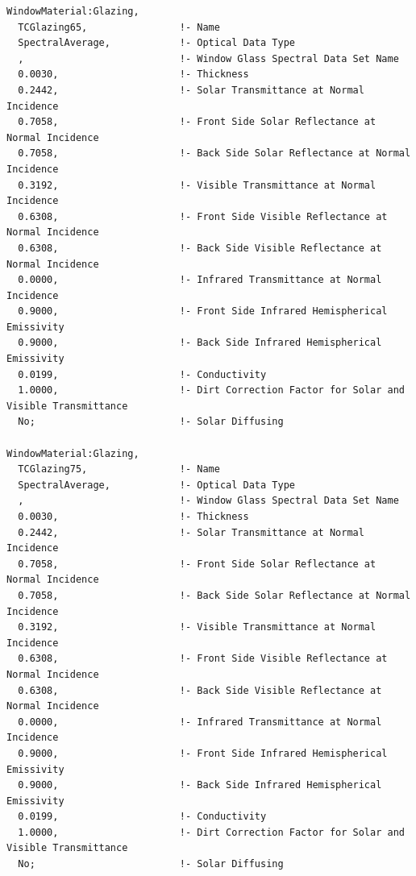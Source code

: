 \begin{lstlisting}
WindowMaterial:Glazing,
  TCGlazing65,                !- Name
  SpectralAverage,            !- Optical Data Type
  ,                           !- Window Glass Spectral Data Set Name
  0.0030,                     !- Thickness
  0.2442,                     !- Solar Transmittance at Normal Incidence
  0.7058,                     !- Front Side Solar Reflectance at Normal Incidence
  0.7058,                     !- Back Side Solar Reflectance at Normal Incidence
  0.3192,                     !- Visible Transmittance at Normal Incidence
  0.6308,                     !- Front Side Visible Reflectance at Normal Incidence
  0.6308,                     !- Back Side Visible Reflectance at Normal Incidence
  0.0000,                     !- Infrared Transmittance at Normal Incidence
  0.9000,                     !- Front Side Infrared Hemispherical Emissivity
  0.9000,                     !- Back Side Infrared Hemispherical Emissivity
  0.0199,                     !- Conductivity
  1.0000,                     !- Dirt Correction Factor for Solar and Visible Transmittance
  No;                         !- Solar Diffusing

WindowMaterial:Glazing,
  TCGlazing75,                !- Name
  SpectralAverage,            !- Optical Data Type
  ,                           !- Window Glass Spectral Data Set Name
  0.0030,                     !- Thickness
  0.2442,                     !- Solar Transmittance at Normal Incidence
  0.7058,                     !- Front Side Solar Reflectance at Normal Incidence
  0.7058,                     !- Back Side Solar Reflectance at Normal Incidence
  0.3192,                     !- Visible Transmittance at Normal Incidence
  0.6308,                     !- Front Side Visible Reflectance at Normal Incidence
  0.6308,                     !- Back Side Visible Reflectance at Normal Incidence
  0.0000,                     !- Infrared Transmittance at Normal Incidence
  0.9000,                     !- Front Side Infrared Hemispherical Emissivity
  0.9000,                     !- Back Side Infrared Hemispherical Emissivity
  0.0199,                     !- Conductivity
  1.0000,                     !- Dirt Correction Factor for Solar and Visible Transmittance
  No;                         !- Solar Diffusing


\end{lstlisting}
